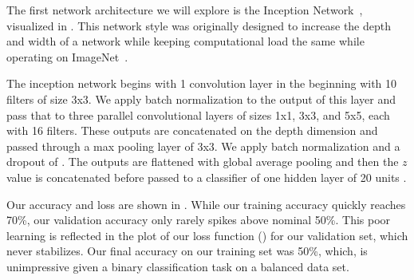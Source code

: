 The first network architecture we will explore is the Inception Network~\cite{szegedy2015going}, visualized in . 
This network style was originally designed to increase the depth and width of a network while keeping computational load the same while operating on ImageNet~\cite{deng2009imagenet}. 

The inception network begins with 1 convolution layer in the beginning with 10 filters of size 3x3. 
We apply batch normalization to the output of this layer and pass that to three parallel convolutional layers of sizes 1x1, 3x3, and 5x5, each with 16 filters. 
These outputs are concatenated on the depth dimension and passed through a max pooling layer of 3x3.
We apply batch normalization and a dropout of . 
The outputs are flattened with global average pooling and then the $z$ value is concatenated before passed to a classifier of one hidden layer of 20 units . 

Our accuracy and loss are shown in . 
While our training accuracy quickly reaches 70\%, our validation accuracy only rarely spikes above nominal 50\%. 
This poor learning is reflected in the plot of our loss function () for our validation set, which never stabilizes. 
Our final accuracy on our training set was 50\%, which, is unimpressive given a binary classification task on a balanced data set. 

